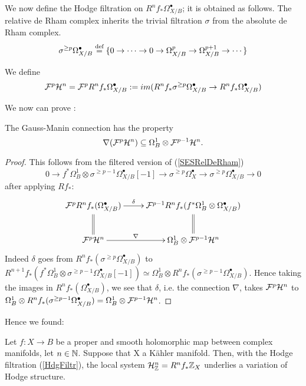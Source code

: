 \documentclass[../main.tex]{subfiles}
\begin{document}
We now define the Hodge filtration on $R^n f_*\Omega^\bullet_{X/B}$; it is obtained as follows. The relative de Rham complex inherits the trivial filtration $\sigma$ from the absolute de Rham complex.
\[
\sigma^{\geq p} \Omega^\bullet_{X/B} \stackrel{\text{def}}{=} \{ 0 \to \cdots \to 0 \to \Omega^p_{X/B} \to \Omega^{p+1}_{X/B} \to \cdots  \}
\]

We define
\begin{equation}
\mathcal{F}^p \mathcal{H}^n = \mathcal{F}^p R^n f_* \Omega^\bullet_{X/B} := im (R^n f_* \sigma^{\geq p} \Omega^\bullet_{X/B} \to R^n f_* \Omega^\bullet_{X/B}) \label{HdgFiltr}
\end{equation}

We now can prove :
\begin{cor} \textup{\cite[Cor.10.31]{PS08}}
     The Gauss-Manin connection has the property
     \[
     \nabla(\mathcal{F}^p\mathcal{H}^n) \subseteq \Omega^1_B \otimes \mathcal{F}^{p-1}\mathcal{H}^n.
     \]
\end{cor}
\begin{proof}
    This follows from the filtered version of (\ref{SESRelDeRham})
    \[
0 \to f^*\Omega^1_B \otimes \sigma^{\geq p-1}\Omega^\bullet_{X/B}[-1] \to \sigma^{\geq p} \Omega^\bullet_X \to \sigma^{\geq p}\Omega^\bullet_{X/B} \to 0
    \]
after applying $R f_*$:
\begin{equation*}
\xymatrix{
   \calF^p R^n f_*(\Omega^\bullet_{X/B}) \ar@{=}[d]  \ar[r]^-{\delta} & \calF^{p-1} R^n f_*(f^*\Omega^1_B \otimes \Omega^\bullet_{X/B}) \ar@{=}[d]  \\ 
   \calF^p \calH^n  \ar[r]^-{\nabla} &  \Omega^1_B \otimes \calF^{p-1} \calH^n
}
\end{equation*}
Indeed $\delta$ goes from $R^n f_*( \sigma^{\geq p}\Omega^\bullet_{X/B})$ to $R^{n+1} f_* ( f^*\Omega^1_B \otimes \sigma^{\geq p-1}\Omega^\bullet_{X/B}[-1]) \simeq \Omega^1_B \otimes  R^n f_* ( \sigma^{\geq p-1}\Omega^\bullet_{X/B}) $. Hence taking the images in $R^n f_*( \Omega^\bullet_{X/B})$, we see that $\delta$, i.e. the connection $\nabla$, takes $\mathcal{F}^p\mathcal{H}^n$ to $\Omega^1_B \otimes  R^n f_* ( \sigma^{\geq p-1}\Omega^\bullet_{X/B}) = \Omega^1_B \otimes \mathcal{F}^{p-1}\mathcal{H}^n $.
\end{proof}
Hence we found:
\begin{cor}
     Let $f \colon X \to B$ be a proper and smooth holomorphic map between complex manifolds, let $n \in \mathbb{N}$. Suppose that X a K\"ahler manifold. Then, with the Hodge filtration (\ref{HdgFiltr}), the local system $\mathcal{H}^n_{\mathbb{Z}} = R^n f_* \mathbb{Z}_X$ underlies a variation of Hodge structure.
\end{cor}

 



\ifSubfilesClassLoaded{
}{} %
\end{document}
